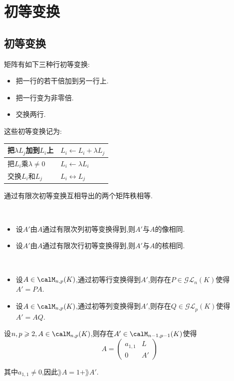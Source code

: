 \chapter{初等变换}

\section{初等变换}

矩阵有如下三种行初等变换:
\begin{itemize}
    \item 把一行的若干倍加到另一行上.
    \item 把一行变为非零倍.
    \item 交换两行.
\end{itemize}

这些初等变换记为:
\begin{table}[htbp]
    \centering
    \begin{tabular}{|l|l|}
        \hline
        把$\lambda L_j$加到$L_i$上 & $L_i \leftarrow L_i + \lambda L_j$ \\
        \hline
        把$L_i$乘$\lambda \neq 0$ & $L_i \leftarrow \lambda L_i$ \\
        \hline
        交换$L_i$和$L_j$ & $L_i \leftrightarrow L_j$ \\
        \hline
    \end{tabular}
\end{table}

\begin{prop}
    通过有限次初等变换互相导出的两个矩阵秩相等.
\end{prop}

\begin{prop} $\ $
    \begin{itemize}
        \item 设$A'$由$A$通过有限次列初等变换得到,则$A'$与$A$的像相同.
        \item 设$A'$由$A$通过有限次行初等变换得到,则$A'$与$A$的核相同.
    \end{itemize}
\end{prop}

\begin{prop} $\ $
    \begin{itemize}
        \item 设$A \in \calM_{n, p}(K)$,通过初等行变换得到$A'$,则存在$P \in \mathcal{GL}_n(K)$使得$A' = PA$.
        \item 设$A \in \calM_{n, p}(K)$,通过初等列变换得到$A'$,则存在$Q \in \mathcal{GL}_p(K)$使得$A' = AQ$.
    \end{itemize}
\end{prop}

\begin{lem}
    设$n, p \geqslant 2, A \in \calM_{n, p}(K)$,则存在$A' \in \calM_{n - 1, p - 1}(K)$使得
    \[ A = \begin{pmatrix} a_{1, 1} & L \\ 0 & A' \end{pmatrix} \]

    其中$a_{1, 1} \neq 0$,因此$\rang A = 1 + \rang A'$.
\end{lem}